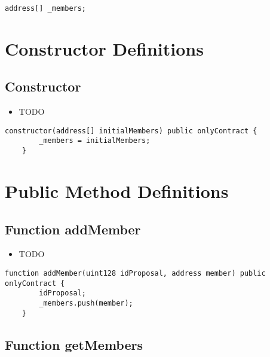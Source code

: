 \begin{lstlisting}[firstnumber=12]
    address[] _members;
\end{lstlisting}

\section{Constructor Definitions}


\subsection{Constructor}

\begin{itemize}
\item TODO
\end{itemize}

\begin{lstlisting}[firstnumber=15]
    constructor(address[] initialMembers) public onlyContract {
        _members = initialMembers;
    }
\end{lstlisting}

\section{Public Method Definitions}


\subsection{Function addMember}

\begin{itemize}
\item TODO
\end{itemize}

\begin{lstlisting}[firstnumber=25]
    function addMember(uint128 idProposal, address member) public onlyContract {
        idProposal;
        _members.push(member);
    }
\end{lstlisting}

\subsection{Function getMembers}

